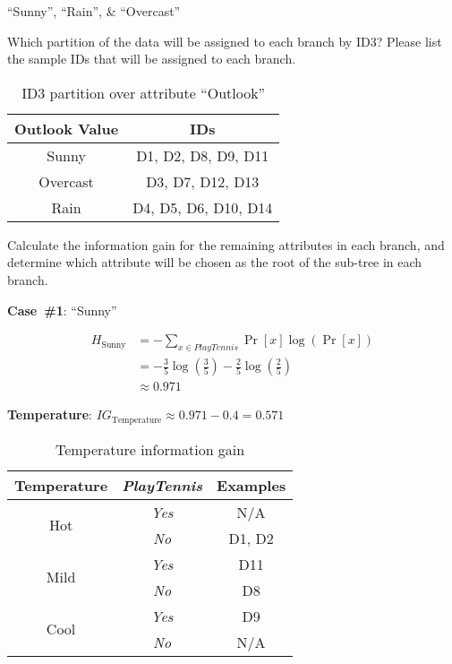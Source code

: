 ``Sunny'', ``Rain'', \& ``Overcast''

\begin{subproblem}
  Which partition of the data will be assigned to each branch by ID3? Please list the sample IDs that will be assigned to each branch.
\end{subproblem}

\begin{table}[h]
  \centering
  \caption{ID3 partition over attribute ``Outlook''}\label{tab:P02:Partition}
  \begin{tabular}{|c|c|}
    \hline
    \textbf{Outlook Value} & \textbf{IDs} \\\hline
    Sunny    & D1, D2, D8, D9, D11 \\\hline
    Overcast & D3, D7, D12, D13 \\\hline
    Rain     & D4, D5, D6, D10, D14 \\\hline
  \end{tabular}
\end{table}

\begin{subproblem}
  Calculate the information gain for the remaining attributes in each branch, and determine which attribute will be chosen as the root of the sub-tree in each branch.
\end{subproblem}

\noindent
{\large \textbf{Case~\#1}: ``Sunny''}

\begin{align*}
  H_{\text{Sunny}} &= -\sum_{x\in PlayTennis} \Pr[x] \log \left(\Pr[x]\right) \\
                   &= - \frac{3}{5} \log\left(\frac{3}{5}\right) - \frac{2}{5} \log\left(\frac{2}{5}\right) \\
                   &\approx 0.971
\end{align*}

\noindent
\textbf{Temperature}: $IG_{\text{Temperature}} \approx 0.971 - 0.4 = \boxed{0.571}$

  \begin{table}[h]
    \centering
    \caption{Temperature information gain}
    \begin{tabular}{c|c|c}
      \hline
      Temperature  & \textit{PlayTennis} & Examples \\\hline\hline
      \multirow{2}{*}{Hot}  & \textit{Yes} & N/A \\
                            & \textit{No}  & D1, D2\\\hline
      \multirow{2}{*}{Mild} & \textit{Yes} & D11 \\
                            & \textit{No}  & D8 \\\hline
      \multirow{2}{*}{Cool} & \textit{Yes} & D9 \\
                            & \textit{No}  & N/A \\\hline
    \end{tabular}
  \end{table}

